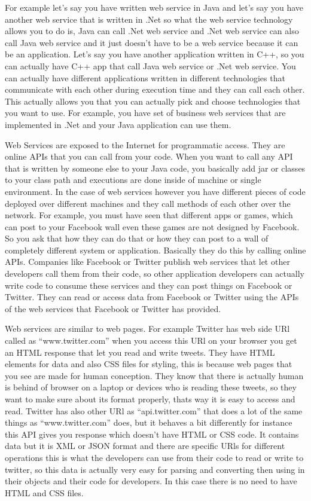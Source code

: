 For example let’s say you have written web service in Java and let’s say you have another web service that is written in .Net so what the web service technology allows you to do is, Java can call .Net web service and .Net web service can also call Java web service and it just doesn’t have to be a web service because it can be an application. Let’s say you have another application written in C++, so you can actually have C++ app that call Java web service or .Net web service. You can actually have different applications written in different technologies that communicate with each other during execution time and they can call each other. This actually allows you that you can actually pick and choose technologies that you want to use. For example, you have set of business web services that are implemented in .Net and your Java application can use them.

Web Services are exposed to the Internet for programmatic access. They are online APIs that you can call from your code. When you want to call any API that is written by someone else to your Java code, you basically add jar or classes to your class path and executions are done inside of machine or single environment. In the case of web services however you have different pieces of code deployed over different machines and they call methods of each other over the network. For example, you must have seen that different apps or games, which can post to your Facebook wall even these games are not designed by Facebook. So you ask that how they can do that or how they can post to a wall of completely different system or application. Basically they do this by calling online APIs. Companies like Facebook or Twitter publish web services that let other developers call them from their code, so other application developers can actually write code to consume these services and they can post things on Facebook or Twitter. They can read or access data from Facebook or Twitter using the APIs of the web services that Facebook or Twitter has provided.

Web services are similar to web pages. For example Twitter has web side URl called as “www.twitter.com”  when you access this URl on your browser you get an HTML response that let you read and write tweets. They have HTML elements for data and also CSS files for styling, this is because web pages that you see are made for human conception. They know that there is actually human is behind of browser on a laptop or devices who is reading these tweets, so they want to make sure about its format properly, thats way it is easy to access and read. Twitter has also other URl as “api.twitter.com” that does a lot of the same things as “www.twitter.com” does, but it behaves a bit differently for instance this API gives you response which doesn’t have HTML or CSS code. It contains data but it is XML or JSON format and there are specific URls for different operations this is what the developers can use from their code to read or write to twitter, so this data is actually very easy for parsing and converting then using in their objects and their code for developers. In this case there is no need to have HTML and CSS files.

